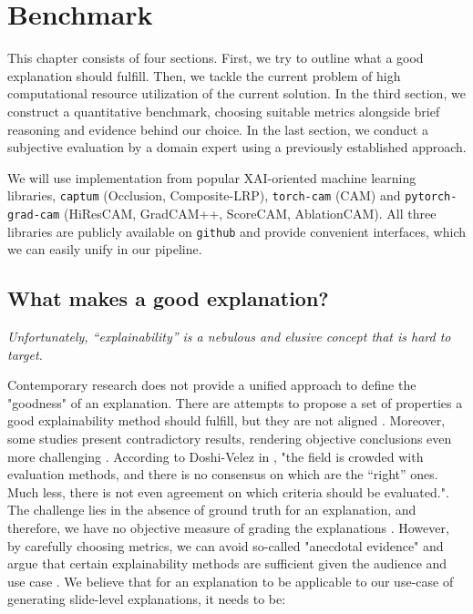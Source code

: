 \chapter{Benchmark}\label{experiment}

This chapter consists of four sections. First, we try to outline what a good explanation should fulfill. Then, we tackle the current problem of high computational resource utilization of the current solution. In the third section, we construct a quantitative benchmark, choosing suitable metrics alongside brief reasoning and evidence behind our choice. In the last section, we conduct a subjective evaluation by a domain expert using a previously established approach.

We will use implementation from popular XAI-oriented machine learning libraries, \texttt{captum} (Occlusion, Composite-LRP), \texttt{torch-cam} (CAM) and \texttt{pytorch-grad-cam} (HiResCAM, GradCAM++, ScoreCAM, AblationCAM). All three libraries are publicly available on \texttt{github} and provide convenient interfaces, which we can easily unify in our pipeline.

\section{What makes a good explanation?}

\emph{Unfortunately, “explainability” is a nebulous and elusive concept that is hard to target.} \cite{explainability-hard}
\newline
\noindent

Contemporary research does not provide a unified approach to define the "goodness" of an explanation. There are attempts to propose a set of properties a good explainability method should fulfill, but they are not aligned \cite{xai-functionality-grounded, explainability-hard, xai-meta-survey, xai-zhou-survey}. Moreover, some studies present contradictory results, rendering objective conclusions even more challenging \cite{xai-zhou-survey}. According to Doshi-Velez in \cite{xai-doshi}, "the field is crowded with evaluation methods, and there is no consensus on which are the “right” ones. Much less, there is not even agreement on which criteria should be evaluated.". The challenge lies in the absence of ground truth for an explanation, and therefore, we have no objective measure of grading the explanations \cite{xai-zhou-survey}. However, by carefully choosing metrics, we can avoid so-called "anecdotal evidence" and argue that certain explainability methods are sufficient given the audience and use case \cite{xai-anecdotal-evidence}. We believe that for an explanation to be applicable to our use-case of generating slide-level explanations, it needs to be:

